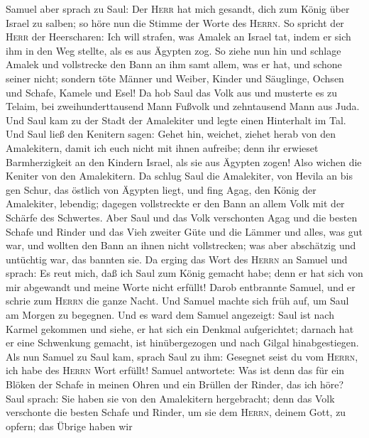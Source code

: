  Samuel aber sprach zu Saul: Der \textsc{Herr} hat mich
gesandt, dich zum König über Israel zu salben; so höre nun die Stimme
der Worte des \textsc{Herrn}.  So spricht der
\textsc{Herr} der Heerscharen: Ich will strafen, was Amalek an Israel
tat, indem er sich ihm in den Weg stellte, als es aus Ägypten zog.
 So ziehe nun hin und schlage Amalek und vollstrecke den
Bann an ihm samt allem, was er hat, und schone seiner nicht; sondern
töte Männer und Weiber, Kinder und Säuglinge, Ochsen und Schafe, Kamele
und Esel!  Da hob Saul das Volk aus und musterte es zu
Telaim, bei zweihunderttausend Mann Fußvolk und zehntausend Mann aus
Juda.  Und Saul kam zu der Stadt der Amalekiter und legte
einen Hinterhalt im Tal.  Und Saul ließ den Kenitern
sagen: Gehet hin, weichet, ziehet herab von den Amalekitern, damit ich
euch nicht mit ihnen aufreibe; denn ihr erwieset Barmherzigkeit an den
Kindern Israel, als sie aus Ägypten zogen! Also wichen die Keniter von
den Amalekitern.  Da schlug Saul die Amalekiter, von
Hevila an bis gen Schur, das östlich von Ägypten liegt, 
und fing Agag, den König der Amalekiter, lebendig; dagegen vollstreckte
er den Bann an allem Volk mit der Schärfe des Schwertes. 
Aber Saul und das Volk verschonten Agag und die besten Schafe und Rinder
und das Vieh zweiter Güte und die Lämmer und alles, was gut war, und
wollten den Bann an ihnen nicht vollstrecken; was aber abschätzig und
untüchtig war, das bannten sie.  Da erging das Wort des
\textsc{Herrn} an Samuel und sprach:  Es reut mich, daß
ich Saul zum König gemacht habe; denn er hat sich von mir abgewandt und
meine Worte nicht erfüllt! Darob entbrannte Samuel, und er schrie zum
\textsc{Herrn} die ganze Nacht.  Und Samuel machte sich
früh auf, um Saul am Morgen zu begegnen. Und es ward dem Samuel
angezeigt: Saul ist nach Karmel gekommen und siehe, er hat sich ein
Denkmal aufgerichtet; darnach hat er eine Schwenkung gemacht, ist
hinübergezogen und nach Gilgal hinabgestiegen.  Als nun
Samuel zu Saul kam, sprach Saul zu ihm: Gesegnet seist du vom
\textsc{Herrn}, ich habe des \textsc{Herrn} Wort erfüllt!
 Samuel antwortete: Was ist denn das für ein Blöken der
Schafe in meinen Ohren und ein Brüllen der Rinder, das ich höre?
 Saul sprach: Sie haben sie von den Amalekitern
hergebracht; denn das Volk verschonte die besten Schafe und Rinder, um
sie dem \textsc{Herrn}, deinem Gott, zu opfern; das Übrige haben wir

